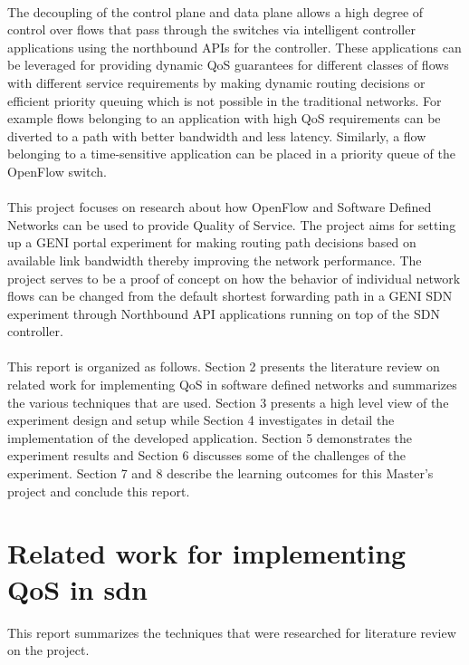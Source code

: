 \documentclass[paper=a4, fontsize=12pt]{scrartcl}	%
\numberwithin{equation}{section}		%
\numberwithin{figure}{section}			%
\numberwithin{table}{section}				%
\begin{document}
\\
The decoupling of the control plane and data plane allows a high degree of control over flows that pass through the switches via intelligent controller applications using the northbound APIs for the controller. These applications can be leveraged for providing dynamic QoS guarantees for different classes of flows with different service requirements by making dynamic routing decisions or efficient priority queuing which is not possible in the traditional networks. For example flows belonging to an application with high QoS requirements can be diverted to a path with better bandwidth and less latency. Similarly, a flow belonging to a time-sensitive application can be placed in a priority queue of the OpenFlow switch.
\\
\\
This project focuses on research about how OpenFlow and Software Defined Networks can be used to provide Quality of Service. The project aims for setting up a GENI portal experiment for making routing path decisions based on available link bandwidth thereby improving the network performance. The project serves to be a proof of concept on how the behavior of individual network flows can be changed from the default shortest forwarding path in a GENI SDN experiment through Northbound API applications running on top of the SDN controller.
\\
\\
This report is organized as follows. Section 2 presents the literature review on related work for implementing QoS in software defined networks and summarizes the various techniques that are used. Section 3 presents a high level view of the experiment design and setup while Section 4 investigates in detail the implementation of the developed application. Section 5 demonstrates the experiment results and Section 6 discusses some of the challenges of the experiment. Section 7 and 8 describe the learning outcomes for this Master's project and conclude this report.

\section{Related work for implementing QoS in sdn}
This report summarizes the techniques that were researched for literature review on the project.
\end{document}
